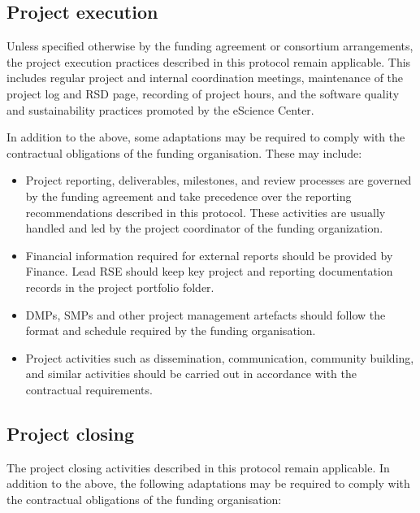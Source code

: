 \subsection{Project execution}
Unless specified otherwise by the funding agreement or consortium arrangements, the project execution practices 
described in this protocol remain applicable. This includes regular project and internal coordination meetings, 
maintenance of the project log and RSD page, recording of project hours, and the software quality and sustainability 
practices promoted by the eScience Center.

In addition to the above, some adaptations may be required to comply with the contractual obligations of the funding 
organisation. These may include:
\vspace{-0.2cm}
\begin{itemize}
 \item Project reporting, deliverables, milestones, and review processes are governed by the funding agreement and 
 take precedence over the reporting recommendations described in this protocol. These activities are usually handled 
 and led by the project coordinator of the funding organization. 
 \item Financial information required for external reports should be provided by Finance. Lead RSE should keep key 
 project and reporting documentation records in the project portfolio folder.
 \item DMPs, SMPs and other project management artefacts should follow the format and schedule required by the 
 funding organisation.
 \item Project activities such as dissemination, communication, community building, and similar activities should be 
 carried out in accordance with the contractual requirements.
\end{itemize}
\vspace{-0.2cm}

\subsection{Project closing}
The project closing activities described in this protocol remain applicable. In addition to the above, the following 
adaptations may be required to comply with the contractual obligations of the funding organisation:

